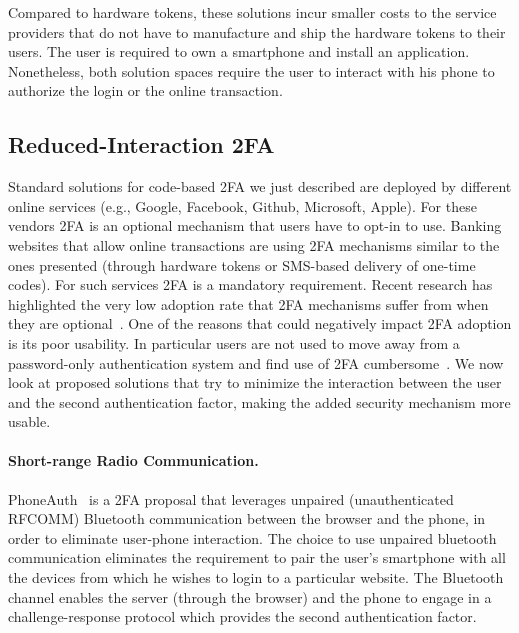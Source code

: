 Compared to hardware tokens, these solutions incur smaller costs to the service providers that do not have to manufacture and ship the hardware tokens to their users. The user is required to own a smartphone and install an application. Nonetheless, both solution spaces require the user to interact with his phone to authorize the login or the online transaction.

\subsection{Reduced-Interaction 2FA}

Standard solutions for code-based 2FA we just described are deployed by different online services (e.g., Google, Facebook, Github, Microsoft, Apple). For these vendors 2FA is an optional mechanism that users have to opt-in to use. Banking websites that allow online transactions are using 2FA mechanisms similar to the ones presented (through hardware tokens or SMS-based delivery of one-time codes). For such services 2FA is a mandatory requirement. Recent research has highlighted the very low adoption rate that 2FA mechanisms suffer from when they are optional~\cite{petsas15eurosec,imperi13umsurvey}. One of the reasons that could negatively impact 2FA adoption is its poor usability. In particular users are not used to move away from a password-only authentication system and find use of 2FA cumbersome~\cite{gunson11cs,weir10int}. We now look at proposed solutions that try to minimize the interaction between the user and the second authentication factor, making the added security mechanism more usable.

\paragraph{Short-range Radio Communication.}
PhoneAuth~\cite{czeskis12ccs} is a 2FA proposal that leverages unpaired (unauthenticated RFCOMM) Bluetooth communication between the browser and the phone, in order to eliminate user-phone interaction. The choice to use unpaired bluetooth communication eliminates the requirement to pair the user's smartphone with all the devices from which he wishes to login to a particular website.
The Bluetooth channel enables the server (through the browser) and the phone to engage in a challenge-response protocol which provides the second authentication factor.

